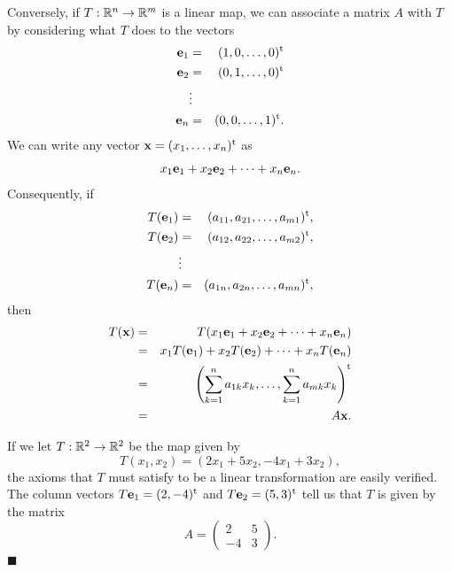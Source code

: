  
Conversely, if $T : {\Bbb R}^n \rightarrow {\Bbb R}^m$ is a linear
map, we can associate a matrix $A$ with $T$ by considering what $T$
does to the vectors 
\begin{eqnarray*}
{\bold e}_1 & = & (1, 0, \ldots, 0)^{\rm t} \\
{\bold e}_2 & = & (0, 1, \ldots, 0)^{\rm t} \\
            &  \vdots &  \\
{\bold e}_n & = & (0, 0, \ldots, 1)^{\rm t}.
\end{eqnarray*}
We can write any vector ${\bold x} = (x_1, \ldots, x_n)^{\rm t}$ as
\[
x_1 {\bold e}_1 + x_2 {\bold e}_2 + \cdots + x_n {\bold e}_n.
\]
Consequently, if
\begin{eqnarray*}
T({\bold e}_1) & = & (a_{11}, a_{21}, \ldots, a_{m1})^{\rm t}, \\
T({\bold e}_2) & = & (a_{12}, a_{22}, \ldots, a_{m2})^{\rm t}, \\
            &  \vdots &  \\
T({\bold e}_n) & = & (a_{1n}, a_{2n}, \ldots, a_{mn})^{\rm t},
\end{eqnarray*}
then
\begin{eqnarray*}
T({\bold x} )
& = &
T(x_1 {\bold e}_1 + x_2 {\bold e}_2 + \cdots + x_n {\bold e}_n) \\
& = &
x_1 T({\bold e}_1) + x_2 T({\bold e}_2) + \cdots + x_n T({\bold e}_n)
\\ 
& = &
\left( \sum_{k=1}^{n} a_{1k} x_k, \ldots,  \sum_{k=1}^{n} a_{mk} x_k
\right)^{\rm t} \\ 
& = & 
A {\bold x}.
\end{eqnarray*}
 
 
\vspace{1.5ex}
 
 
If we let $T : {\Bbb R}^2 \rightarrow {\Bbb R}^2$ be the map given by 
\[
T(x_1, x_2) = (2 x_1 + 5 x_2, - 4 x_1 + 3 x_2),
\]
the axioms that $T$ must satisfy to be a linear transformation are
easily verified. The column vectors $T {\bold e}_1 = (2, -4)^{\rm t}$
and $T {\bold e}_2 = (5,3)^{\rm t}$  tell us that $T$ is given by the
matrix 
\[
A =
\left(
\begin{array}{cc}
2 & 5 \\
-4 & 3
\end{array}
\right).
\]
\hspace{\fill} $\blacksquare$
 
 
\vspace{1.5ex}
 

